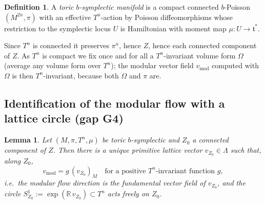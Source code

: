 \documentclass{amsart}
\newtheorem{lemma}{Lemma}
\theoremstyle{definition}
\newtheorem{definition}{Definition}
\begin{document}
\begin{definition}\label{def:toricb}
A \emph{toric $b$-symplectic manifold} is a compact connected $b$-Poisson
$(M^{2n},\pi)$ with an effective $T^n$-action by Poisson diffeomorphisms whose
restriction to the symplectic locus $U$ is Hamiltonian with moment map
$\mu\colon U\to\mathfrak t^*$.
\end{definition}

Since $T^n$ is connected it preserves $\pi^n$, hence $Z$, hence each connected
component of $Z$. As $T^n$ is compact we fix once and for all a $T^n$-invariant
volume form $\Omega$ (average any volume form over $T^n$); the modular vector
field $v_{\mathrm{mod}}$ computed with $\Omega$ is then $T^n$-invariant, because
both $\Omega$ and $\pi$ are.

\subsection*{Identification of the modular flow with a lattice circle (gap G4)}

\begin{lemma}\label{lem:G4}
Let $(M,\pi,T^n,\mu)$ be toric $b$-symplectic and $Z_0$ a connected component of
$Z$. Then there is a unique primitive lattice vector $v_{Z_0}\in\Lambda$ such
that, along $Z_0$,
\[
v_{\mathrm{mod}}=g\,(v_{Z_0})_M\quad\text{for a positive }T^n\text{-invariant
function }g,
\]
i.e.\ the modular flow direction is the fundamental vector field of $v_{Z_0}$,
and the circle $S^1_{Z_0}:=\exp(\mathbb R\,v_{Z_0})\subset T^n$ acts freely on
$Z_0$.
\end{lemma}
\end{document}
